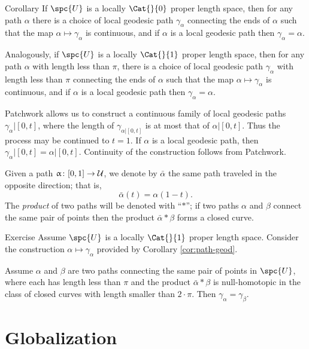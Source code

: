 \begin{thm}{Corollary}\label{cor:path-geod}
If $\spc{U}$ is a locally $\Cat{}{0}$ proper length space, then 
for any path $\alpha$ there is a choice of local geodesic path $\gamma_\alpha$  connecting the ends of $\alpha$ such that the map $\alpha\mapsto\gamma_\alpha$ is continuous, and if $\alpha$ is a local geodesic path then $\gamma_\alpha=\alpha$. 

Analogously, if $\spc{U}$ is a locally $\Cat{}{1}$ proper length space, then 
for any path $\alpha$ with length less than $\pi$,  
there is a choice of local geodesic path $\gamma_\alpha$ with length less than $\pi$ connecting the ends of $\alpha$ such that the map $\alpha\mapsto\gamma_\alpha$ is continuous, and if $\alpha$ is a local geodesic path then $\gamma_\alpha=\alpha$.
\end{thm}

 Patchwork allows us to  construct a continuous family of local geodesic paths $\gamma_{\alpha}|[0,t]$, where the length of $\gamma_{\alpha|[0,t]}$ is at most that of  $\alpha|[0,t]$.  Thus the process may be continued to $t=1$. If $\alpha$ is a local geodesic path, then $\gamma_\alpha|[0,t]=\alpha|[0,t]$. Continuity of the construction follows from Patchwork. \qeds

Given a path $\alpha\:[0,1]\to\spc{U}$,
we denote by $\bar\alpha$ the same path traveled in the opposite direction;
that is,
\[\bar\alpha(t)=\alpha(1-t).\]
The \emph{product} of two paths  will be denoted with ``$*$'';
if two paths $\alpha$ and $\beta$ connect the same pair of points then the product $\bar\alpha*\beta$ forms a closed curve.

\begin{thm}{Exercise}\label{ex:null-homotopic}
Assume $\spc{U}$ is a locally $\Cat{}{1}$ proper length space. 
Consider the construction $\alpha\mapsto\gamma_\alpha$ provided by Corollary \ref{cor:path-geod}.

Assume $\alpha$ and $\beta$ are two paths connecting the same pair of points in $\spc{U}$, where 
each has length less than $\pi$ 
and the product  
$\bar\alpha*\beta$ is null-homotopic in the class of closed curves with length smaller than $2\cdot\pi$.  Then $\gamma_\alpha=\gamma_\beta$.
\end{thm}



\section{Globalization}\label{sec:Hadamard--Cartan}

